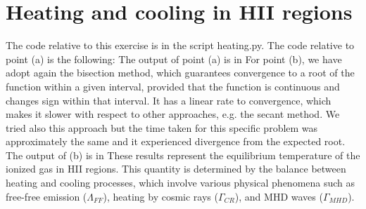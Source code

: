 \section{Heating and cooling in HII regions}
The code relative to this exercise is in the script heating.py. The code relative to point (a) is the following:  The output of point (a) is in  For point (b), we have adopt again the bisection method, which guarantees convergence to a root of the function within a given interval, provided that the function is continuous and changes sign within that interval. It has a linear rate to convergence, which makes it slower with respect to other approaches, e.g. the secant method. We tried also this approach but the time taken for this specific problem was approximately the same and it experienced divergence from the expected root. The output of (b) is in 
These results represent the equilibrium temperature of the ionized gas in HII regions. This quantity is determined by the balance between heating and cooling processes, which involve various physical phenomena such as free-free emission ($\Lambda_{FF}$), heating by cosmic rays ($\Gamma_{CR}$), and MHD waves ($\Gamma_{MHD}$).


